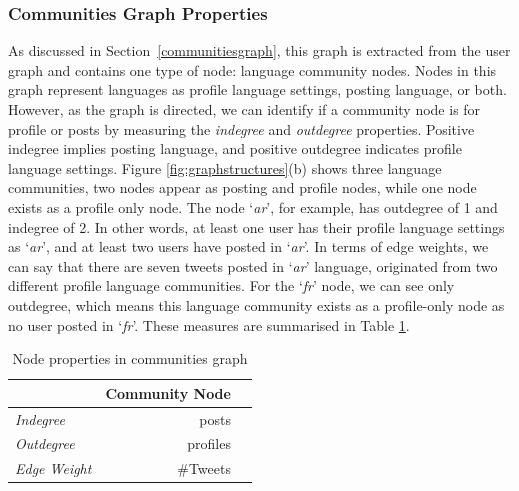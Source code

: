 \documentclass{llncs}
\begin{document}
\subsubsection{Communities Graph Properties}

As discussed in Section~\ref{communitiesgraph}, this graph is
extracted from the user graph and contains one type of node: language
community nodes. Nodes in this graph represent languages as profile
language settings, posting language, or both.  However, as the graph
is directed, we can identify if a community node is for profile or
posts by measuring the \emph{indegree} and \emph{outdegree}
properties.  Positive indegree implies posting language, and positive
outdegree indicates profile language settings. Figure
\ref{fig:graphstructures}(b) shows three language communities, two
nodes appear as posting and profile nodes, while one node exists as a
profile only node. The node `{\emph{ar}}', for example, has outdegree
of 1 and indegree of 2.  In other words, at least one user has their
profile language settings as `{\emph{ar}}', and at least two users
have posted in `{\emph{ar}}'. In terms of edge weights, we can say
that there are seven tweets posted in `{\emph{ar}}' language,
originated from two different profile language communities.  For the
`{\emph{fr}}' node, we can see only outdegree, which means this
language community exists as a profile-only node as no user posted in
`{\emph{fr}}'.  These measures are summarised in Table
\ref{tbl:communitiesgraph}.

\begin{table}[htb]
\centering
\begin{tabular}{@{}lrr@{}}
\toprule
\textbf{}& \textbf{Community Node} \\ \midrule
{\emph{Indegree}} &  posts\\
{\emph{Outdegree}} & profiles \\ 
{\emph{Edge Weight}}& \#Tweets\\ \bottomrule
\end{tabular}
\caption{Node properties in communities graph}
\label{tbl:communitiesgraph}
\end{table}

\end{document}
